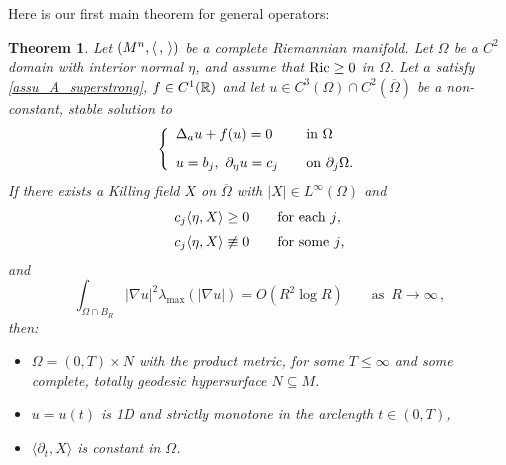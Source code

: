 \documentclass[10 pt,a4paper]{article}
\newtheorem{theorem}[definition]{Theorem}
\theoremstyle{definition}
\begin{document}
Here is our first main theorem for general operators: 

\begin{theorem} \label{teo_splitting_intro}
	Let $(M^n, \langle \, , \, \rangle)$ be a complete Riemannian manifold. Let $\Omega$ be a $C^2$ domain with interior normal $\eta$, and assume that $\mathrm{Ric}\geq 0$ in $\Omega$. Let $a$ satisfy \eqref{assu_A_superstrong}, $f \in C^1(\mathbb R)$ and let $u \in C^3(\Omega)\cap C^2(\overline{\Omega})$ be a non-constant, stable solution to
	\begin{equation}\label{equazu_conbordo}
	\left\{
	\begin{array}{l@{\qquad}l}
		\Delta_a u + f(u) = 0 & \text{in } \Omega \\[0.3cm]
		u = b_j, \ \partial_\eta u = c_j  & \text{on $\partial_j \Omega$}. 
	\end{array}
	\right.
	\end{equation}
	If there exists a Killing field $X$ on $\overline\Omega$ with $|X| \in L^\infty(\Omega)$ and  
	\begin{equation}\label{condi_Hcj_con_a}
		\begin{array}{l}
			\displaystyle c_j \langle \eta, X \rangle \ge 0 \qquad \text{for each $j$,} \\[0.2cm]
			\displaystyle c_j \langle \eta, X \rangle \not \equiv 0 \qquad \text{for some $j$,}
		\end{array} 
	\end{equation}
	and 
	\begin{equation}\label{eq_lowenergy}
			\int_{\Omega \cap B_R} |\nabla u|^2 \lambda_{\max}(|\nabla u|) = O(R^2 \log R) \qquad \text{as } \, R \to \infty \, ,
	\end{equation}
	then: 
	\begin{itemize} 
		\item[i)] $\Omega = (0,T) \times N$ with the product metric, for some $T \le \infty$ and some complete, totally geodesic hypersurface $N \subseteq M$. 
		\item[ii)] $u= u(t)$ is 1D and strictly monotone in the arclength $t \in (0,T)$, 
		\item[iii)] $\langle \partial_t, X \rangle$ is constant in $\Omega$.
	\end{itemize}
\end{theorem}
\end{document}
